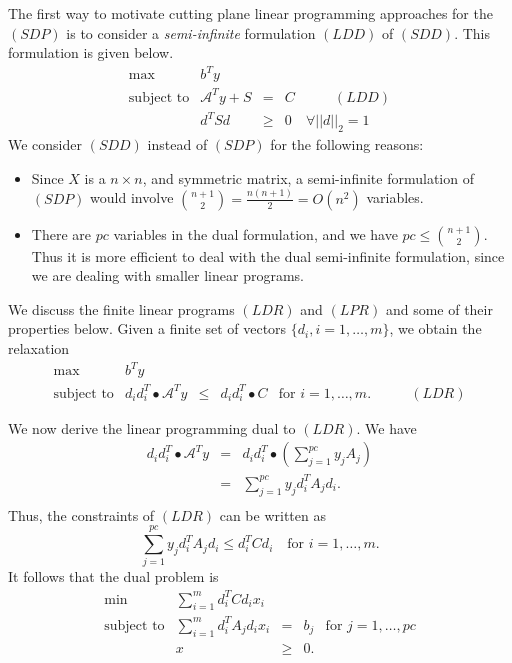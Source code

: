 \documentclass[12pt]{kluwer}
\begin{document}
\begin{article}
The first way to motivate cutting plane linear programming approaches for the $(SDP)$ is to consider a
{\em semi-infinite} formulation $(LDD)$ of $(SDD)$. This formulation is given below.
\begin{displaymath}
\begin{array}{lrccc}
\max & b^Ty \\
\mbox{subject to} & \mathcal{A}^Ty + S & = & C & \qquad (LDD)\\
&  d^TSd & \geq & 0 & \forall ||d||_2 = 1
\end{array}
\end{displaymath}
We consider $(SDD)$ instead of $(SDP)$ for the following reasons:
\begin{itemize}
\item Since $X$ is a $n \times n$, and symmetric matrix, a semi-infinite formulation of $(SDP)$
would involve ${n+1 \choose 2} = \frac{n(n+1)}{2} = O(n^2)$ variables.
\item There are $pc$ variables in the dual formulation, and we have
$pc \le {n+1 \choose 2}$. Thus it is more efficient to deal with the dual semi-infinite formulation,
since we are dealing with smaller linear programs.
\end{itemize}
We discuss the finite linear programs $(LDR)$ and $(LPR)$ and some of their properties below.
Given a finite set of vectors $\{d_i,i=1,\ldots,m\}$, we obtain the relaxation
\begin{displaymath}
\begin{array}{lccclr}
\max & b^Ty \\
\mbox{subject to} &  d_id_i^T \bullet \mathcal{A}^T y & \leq & d_id_i^T \bullet C &
     \mbox{for } i=1,\ldots,m.  & \qquad (LDR)
\end{array}
\end{displaymath}

We now derive the linear programming dual to $(LDR)$.
We have
\begin{eqnarray*}
d_id_i^T \bullet \mathcal{A}^T y
& = & d_id_i^T \bullet (\sum_{j=1}^{pc} y_j A_j)  \\
& = & \sum_{j=1}^{pc} y_j d_i^T A_j d_i.  \\
\end{eqnarray*}
Thus, the constraints of $(LDR)$ can be written as
\begin{displaymath}
\sum_{j=1}^{pc} y_j d_i^T A_j d_i \leq  d_i^T C d_i \quad \mbox{for } i=1,\ldots,m.
\end{displaymath}
It follows that the dual problem is
\begin{displaymath}
\begin{array}{lrcll}
\min & \sum_{i=1}^m d_i^T C d_i x_i  \\
\mbox{subject to} & \sum_{i=1}^m d_i^T A_j d_i x_i & = & b_j
     & \mbox{for }j=1,\ldots,pc  \\
& x & \geq & 0.
\end{array}
\end{displaymath}


\end{article}
\end{document}
